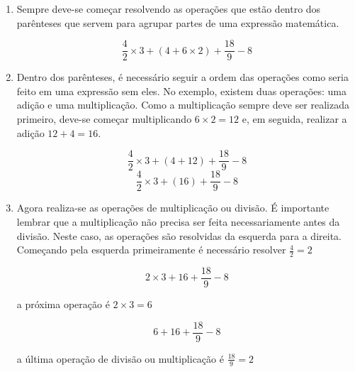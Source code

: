 	\begin{enumerate}
		\item Sempre deve-se começar resolvendo as operações que estão dentro dos parênteses que servem para agrupar partes de uma expressão matemática.
            \begin{tcolorbox}[colback=white,colframe=minha_cor,coltitle=black,title=Passo 1] 
            \[
            \dfrac{4}{2} \times 3+ (4 + 6 \times 2) + \dfrac{18}{9} - 8
            \]
            \end{tcolorbox}		
		\item Dentro dos parênteses, é necessário seguir a ordem das operações como seria feito em uma expressão sem eles. No exemplo, existem duas operações: uma adição e uma multiplicação. Como a multiplicação sempre deve ser realizada primeiro, deve-se começar multiplicando $6 \times 2=12$ e, em seguida, realizar a adição $12+4=16$.
  
            \begin{tcolorbox}[colback=white,colframe=minha_cor,coltitle=black,title=Passo 2] 
            \[
            \dfrac{4}{2} \times 3+ (4 + 12) + \dfrac{18}{9} - 8
            \]
            \[
            \dfrac{4}{2} \times 3+ (16) + \dfrac{18}{9} - 8
            \]
            \end{tcolorbox}
        
		\item Agora realiza-se as operações de multiplicação ou divisão. É importante lembrar que a multiplicação não precisa ser feita necessariamente antes da divisão. Neste caso, as operações são resolvidas da esquerda para a direita. Começando pela esquerda primeiramente é necessário resolver $\frac{4}{2} = 2$
  
             \begin{tcolorbox}[colback=white,colframe=minha_cor,coltitle=black,title=Passo 3.1] 
            \[
            2 \times 3 + 16 + \frac{18}{9} - 8
            \]
            \end{tcolorbox}	
		
		a próxima operação é $2 \times 3 = 6$ 

            \begin{tcolorbox}[colback=white,colframe=minha_cor,coltitle=black,title=Passo 3.2] 
             \[
            6 + 16 + \frac{18}{9} - 8
            \]
            \end{tcolorbox}	
            		
		a última operação de divisão ou multiplicação é $\frac{18}{9} = 2$


\end{enumerate}
